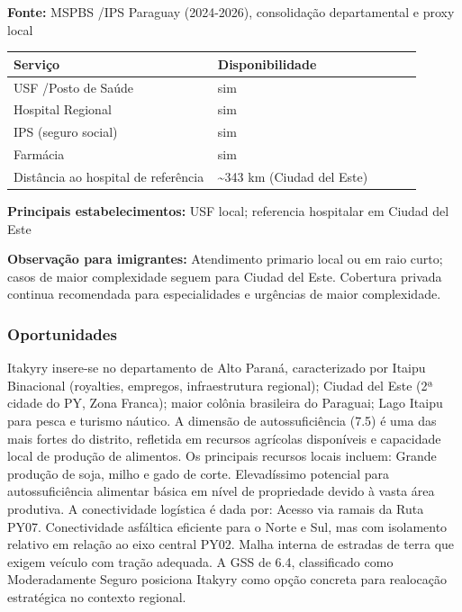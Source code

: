 \textbf{Fonte:} MSPBS /\allowbreak  IPS Paraguay (2024-2026), consolidação
departamental e proxy local

{\def\LTcaptype{none} %
\begin{longtable}{@{}>{\raggedright\arraybackslash}p{0.45\linewidth} >{\raggedright\arraybackslash}p{0.45\linewidth}@{}}
\toprule\noalign{}
Serviço & Disponibilidade \\
\midrule\noalign{}
\endhead
\bottomrule\noalign{}
\endlastfoot
USF /\allowbreak  Posto de Saúde & sim \\
Hospital Regional & sim \\
IPS (seguro social) & sim \\
Farmácia & sim \\
Distância ao hospital de referência & \textasciitilde343 km (Ciudad del
Este) \\
\end{longtable}
}

\textbf{Principais estabelecimentos:} USF local; referencia hospitalar
em Ciudad del Este

\textbf{Observação para imigrantes:} Atendimento primario local ou em
raio curto; casos de maior complexidade seguem para Ciudad del Este.
Cobertura privada continua recomendada para especialidades e urgências
de maior complexidade.
\newpage

\subsubsection*{Oportunidades}\label{oport-itakyry-1006}
Itakyry insere-se no departamento de Alto Paraná, caracterizado por Itaipu Binacional (royalties, empregos, infraestrutura regional); Ciudad del Este (2ª cidade do PY, Zona Franca); maior colônia brasileira do Paraguai; Lago Itaipu para pesca e turismo náutico. A dimensão de autossuficiência (7.5) é uma das mais fortes do distrito, refletida em recursos agrícolas disponíveis e capacidade local de produção de alimentos. Os principais recursos locais incluem: Grande produção de soja, milho e gado de corte. Elevadíssimo potencial para autossuficiência alimentar básica em nível de propriedade devido à vasta área produtiva. A conectividade logística é dada por: Acesso via ramais da Ruta PY07. Conectividade asfáltica eficiente para o Norte e Sul, mas com isolamento relativo em relação ao eixo central PY02. Malha interna de estradas de terra que exigem veículo com tração adequada. A GSS de 6.4, classificado como Moderadamente Seguro posiciona Itakyry como opção concreta para realocação estratégica no contexto regional.

